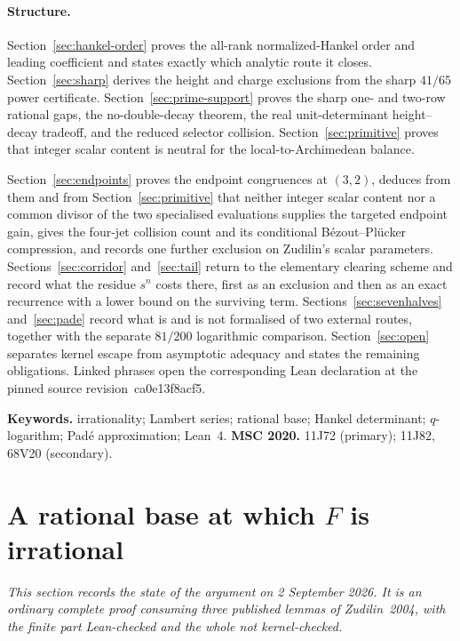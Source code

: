 \documentclass[11pt]{article}
\renewcommand{\commitshort}{ca0e13f8acf5}
\begin{document}
\paragraph{Structure.}
Section~\ref{sec:hankel-order} proves the all-rank normalized-Hankel order and
leading coefficient and states exactly which analytic route it closes.
Section~\ref{sec:sharp} derives the height and charge exclusions from the sharp
$41/65$ power certificate.  Section~\ref{sec:prime-support} proves the sharp
one- and two-row rational gaps, the no-double-decay theorem, the real
unit-determinant height--decay tradeoff, and the reduced selector collision.
Section~\ref{sec:primitive} proves that integer scalar content is neutral for the
local-to-Archimedean balance.

Section~\ref{sec:endpoints} proves the endpoint
congruences at $(3,2)$, deduces from them and from
Section~\ref{sec:primitive} that neither integer scalar content nor a common divisor
of the two specialised evaluations supplies the targeted endpoint gain, gives the
four-jet collision count and its conditional B\'ezout--Pl\"ucker compression, and records one further
exclusion on Zudilin's scalar parameters.
Sections~\ref{sec:corridor} and~\ref{sec:tail} return to the elementary
clearing scheme and record what the residue $s^{n}$ costs there, first as an
exclusion and then as an exact recurrence with a lower bound on the surviving
term.  Sections~\ref{sec:sevenhalves} and~\ref{sec:pade} record what is and is
not formalised of two external routes, together with the separate $81/200$
logarithmic comparison.  Section~\ref{sec:open} separates kernel escape from
asymptotic adequacy and states the remaining obligations.  Linked phrases open the corresponding Lean
declaration at the pinned source revision~\commitshort.

\medskip
\noindent\textbf{Keywords.} irrationality; Lambert series; rational base;
Hankel determinant; $q$-logarithm; Pad\'e approximation; Lean~4.
\qquad
\textbf{MSC 2020.} 11J72 (primary); 11J82, 68V20 (secondary).

\section{A rational base at which $F$ is irrational}
\label{sec:rational-base-irrationality}

\emph{This section records the state of the argument on 2 September 2026.  It
is an ordinary complete proof consuming three published lemmas of
Zudilin~2004, with the finite part Lean-checked and the whole not
kernel-checked.}
\end{document}
